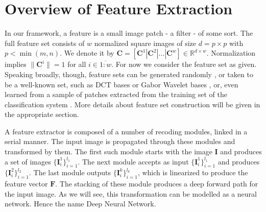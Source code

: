 \documentclass[12pt,a4paper,oneside,english]{UPBThesis}
\newcommand{\hctimes}[2]{{#1}\!\times\!{#2}}
\newcommand{\hcrange}[2]{\overline{{#1}\colon\!\!{#2}}}
\begin{document}
\chapter{Overview of Feature Extraction}

In our framework, a feature is a small image patch - a filter - of some sort. The full feature set consists of $w$ normalized square images of size $d = \hctimes{p}{p}$ with $p < \min(m,n)$. We denote it by $\textbf{C} = \left[ \textbf{C}^1 \left|\right. \textbf{C}^2 \left|\right. \dots \left|\right. \textbf{C}^w \right] \in \mathbb{R}^{\hctimes{d}{w}}$. Normalization implies $\|\mathbf{C}^i\| = 1$ for all $i \in \hcrange{1}{w}$. For now we consider the feature set as given. Speaking broadly, though, feature sets can be generated randomly \cite{random-weights-feature-learning}, or taken to be a well-known set, such as DCT bases or Gabor Wavelet bases \cite{simple-method-sparse-coding}, or, even learned from a sample of patches extracted from the training set of the classification system \cite{emergence-sparse-coding,sparse-coding-strategy-V1,tiny-images}. More details about feature set construction will be given in the appropriate section.

A feature extractor is composed of a number of recoding modules, linked in a serial manner. The input image is propagated through these modules and transformed by them. The first such module starts with the image $\textbf{I}$ and produces a set of images $\{\textbf{I}_i^1\}_{i=1}^{l_1}$. The next module accepts as input $\{\textbf{I}_i^1\}_{i=1}^{l_1}$ and produces $\{\textbf{I}_i^2\}_{i=1}^{l_2}$. The last module outputs $\{\textbf{I}_i^k\}_{i=1}^{l_k}$, which is linearized to produce the feature vector $\mathbf{F}$. The stacking of these module produces a deep forward path for the input image. As we will see, this transformation can be modelled as a neural network. Hence the name Deep Neural Network. 
\end{document}

